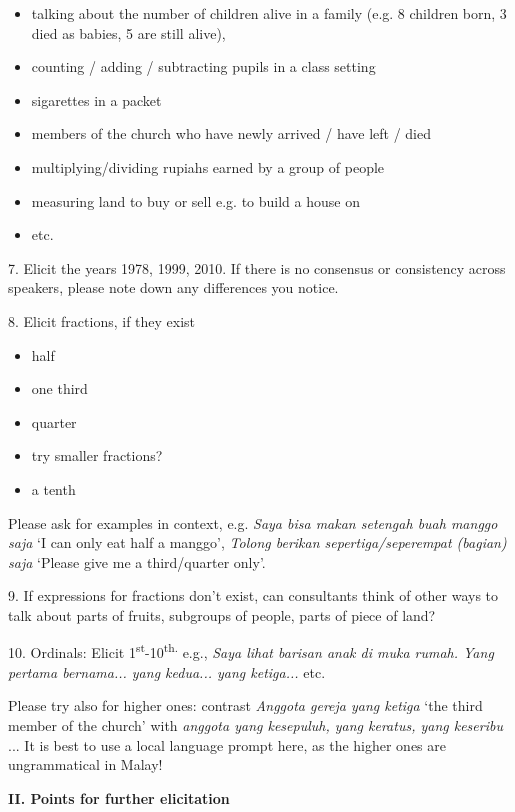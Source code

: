\begin{itemize}
\item talking about the number of children alive in a family (e.g. 8 children born, 3 died as babies, 5 are still alive), 
\item counting / adding / subtracting pupils in a class setting
\item sigarettes in a packet
\item members of the church who have newly arrived / have left / died
\item multiplying/dividing rupiahs earned by a group of people
\item measuring land to buy or sell e.g. to build a house on
\item etc. 
\end{itemize}
7. Elicit the years 1978, 1999, 2010. If there is no consensus or consistency across speakers, please note down any differences you notice. 

8. Elicit fractions, if they exist

\begin{itemize}
\item half
\item one third
\item quarter
\item try smaller fractions?
\item a tenth
\end{itemize}
Please ask for examples in context, e.g. \textit{Saya bisa makan setengah buah manggo saja }{\textquoteleft}I can only eat half a manggo{\textquoteright},\textit{ Tolong berikan sepertiga/seperempat (bagian) saja }{\textquoteleft}Please give me a third/quarter only{\textquoteright}.

9. If expressions for fractions don{\textquoteright}t exist, can consultants think of other ways to talk about parts of fruits, subgroups of people, parts of piece of land?

10. Ordinals: Elicit 1\textsuperscript{st}{}-10\textsuperscript{th. }e.g., \textit{Saya lihat barisan anak di muka rumah. Yang pertama bernama... yang kedua... yang ketiga... }etc.

Please try also for higher ones: contrast \textit{Anggota gereja yang ketiga }{\textquoteleft}the third member of the church{\textquoteright}  with \textit{anggota yang kesepuluh, yang keratus, yang keseribu} ... It is best to use a local language prompt here, as the higher ones are ungrammatical in Malay!

\textbf{II. Points for further elicitation}

